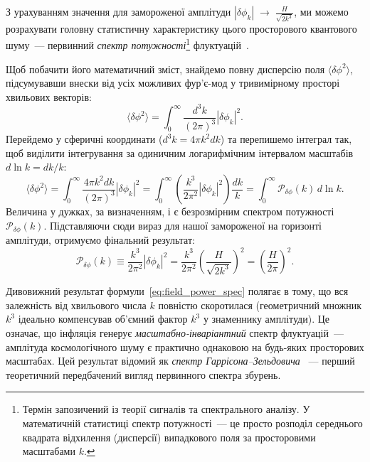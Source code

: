 З урахуванням значення для замороженої
амплітуди $|\delta\phi_k| \;\to\; \frac{H}{\sqrt{2k^3}}$, ми можемо розрахувати головну статистичну характеристику
цього просторового квантового шуму~--- первинний \emph{спектр потужності}\footnote{Термін запозичений із теорії сигналів та спектрального аналізу. У математичній статистиці спектр потужності~--- це просто  розподіл середнього квадрата відхилення (дисперсії) випадкового поля за просторовими масштабами $k$.}
флуктуацій~\cite{mukhanov_chibisov_1981}.

Щоб побачити його математичний зміст, знайдемо повну дисперсію поля $\langle\delta\phi^2\rangle$,
підсумувавши внески від усіх можливих фур'є-мод у тривимірному просторі хвильових векторів:
\begin{equation*}
  \langle\delta\phi^2\rangle = \int_0^\infty \frac{d^3k}{(2\pi)^3} |\delta\phi_k|^2.
\end{equation*}
Перейдемо у сферичні координати ($d^3k = 4\pi k^2 dk$) та перепишемо інтеграл так,
щоб виділити інтегрування за одиничним логарифмічним інтервалом масштабів $d\ln k = dk/k$:
\begin{equation*}
  \langle\delta\phi^2\rangle = \int_0^\infty \frac{4\pi k^2 dk}{(2\pi)^3} |\delta\phi_k|^2
  = \int_0^\infty \left( \frac{k^3}{2\pi^2} |\delta\phi_k|^2 \right) \frac{dk}{k}
  = \int_0^\infty \mathcal{P}_{\delta\phi}(k) \, d\ln k.
\end{equation*}
Величина у дужках, за визначенням, і є безрозмірним спектром потужності $\mathcal{P}_{\delta\phi}(k)$.
Підставляючи сюди вираз для нашої замороженої на горизонті амплітуди, отримуємо фінальний результат:
\begin{equation}\label{eq:field_power_spec}
  \mathcal{P}_{\delta\phi}(k) \equiv \frac{k^3}{2\pi^2}|\delta\phi_k|^2
  = \frac{k^3}{2\pi^2} \left( \frac{H}{\sqrt{2k^3}} \right)^{\!2}
  = \left(\frac{H}{2\pi}\right)^{\!2}.
\end{equation}

Дивовижний результат формули~\eqref{eq:field_power_spec} полягає в тому, що вся
залежність від хвильового числа $k$ повністю скоротилася (геометричний множник $k^3$
ідеально компенсував об'ємний фактор $k^3$ у знаменнику амплітуди). Це означає, що
інфляція генерує \emph{масштабно-інваріантний} спектр флуктуацій~--- амплітуда космологічного шуму є практично однаковою на будь-яких просторових масштабах. Цей результат відомий як \emph{спектр Гаррісона--Зельдовича} \cite{Harrison1970, Zeldovich1972}~--- перший теоретичний
передбачений вигляд первинного спектра збурень.

